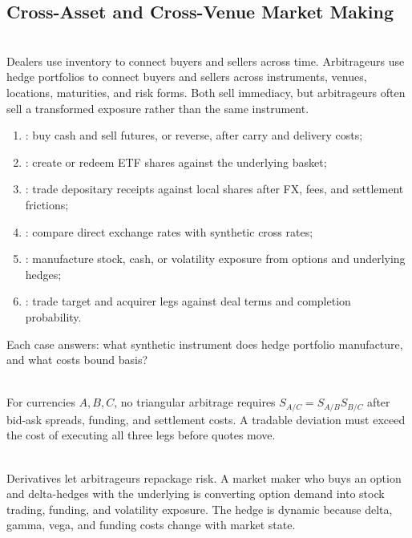 \subsection{Cross-Asset and Cross-Venue Market Making}

\begin{principle} \\
Dealers use inventory to connect buyers and sellers across time. Arbitrageurs use hedge portfolios to connect buyers and sellers across instruments, venues, locations, maturities, and risk forms. Both sell immediacy, but arbitrageurs often sell a transformed exposure rather than the same instrument.
\end{principle}

\begin{taxonomy} 
\begin{enumerate}[label=\roman*.]
\setlength{\itemsep}{0pt}
\item {}: buy cash and sell futures, or reverse, after carry and delivery costs;
\item {}: create or redeem ETF shares against the underlying basket;
\item {}: trade depositary receipts against local shares after FX, fees, and settlement frictions;
\item {}: compare direct exchange rates with synthetic cross rates;
\item {}: manufacture stock, cash, or volatility exposure from options and underlying hedges;
\item {}: trade target and acquirer legs against deal terms and completion probability.
\end{enumerate}
Each case answers: what synthetic instrument does hedge portfolio manufacture, and what costs bound basis?
\end{taxonomy}

\begin{model} \\
For currencies $A,B,C$, no triangular arbitrage requires $S_{A/C}=S_{A/B}S_{B/C}$ after bid-ask spreads, funding, and settlement costs. A tradable deviation must exceed the cost of executing all three legs before quotes move.
\end{model}

\begin{mechanism} \\
Derivatives let arbitrageurs repackage risk. A market maker who buys an option and delta-hedges with the underlying is converting option demand into stock trading, funding, and volatility exposure. The hedge is dynamic because delta, gamma, vega, and funding costs change with market state.
\end{mechanism}

